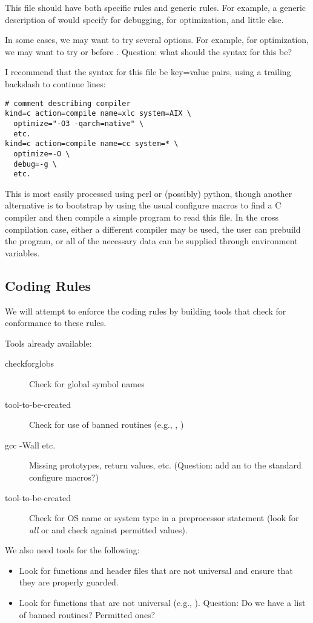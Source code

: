 \documentclass{article}
\begin{document}
This file should have both specific rules and generic rules.  For
example, a generic description of  would specify 
for debugging,  for optimization, and little else.  

In some cases, we may want to try several options.  For example, for
optimization, we may want to try  or  before .
Question:
what should the syntax for this be?

I recommend that the syntax for this file be key=value pairs, using a
trailing backslash to continue lines:
\begin{verbatim}
# comment describing compiler
kind=c action=compile name=xlc system=AIX \
  optimize="-O3 -qarch=native" \
  etc.
kind=c action=compile name=cc system=* \
  optimize=-O \
  debug=-g \
  etc.
\end{verbatim}
This is most easily processed using perl or (possibly) python, though
another alternative is to bootstrap by using the usual configure
macros to find a C compiler and then compile a simple program to read
this file.  In the cross compilation case, either a different compiler
may be used, the user can prebuild the program, or all of the
necessary data can be supplied through environment variables.

\subsection{Coding Rules}
We will attempt to enforce the coding rules by building tools that
check for conformance to these rules.

Tools already available:
\begin{description}
\item[checkforglobs]Check for global symbol names
\item[tool-to-be-created]Check for use of banned routines (e.g., ,
)
\item[gcc -Wall etc.]Missing prototypes, return values,
etc. (Question: add an  to the standard
configure macros?)
\item[tool-to-be-created]Check for OS name or system type in a preprocessor
  statement (look for \emph{all}  or  and
  check against permitted values).
\end{description}

We also need tools for the following:
\begin{itemize}
\item Look for functions and header files that are not universal and
ensure that they are properly guarded.
\item Look for functions that are not universal (e.g., ).
Question: Do we have a list of banned routines?  Permitted ones?
\end{itemize}
\end{document}
